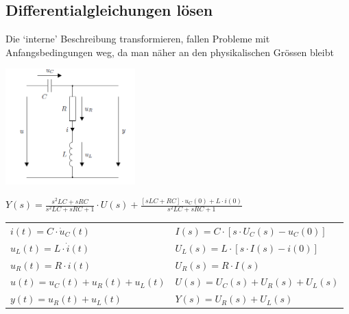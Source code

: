 \subsection{Differentialgleichungen lösen}
Die ‘interne’ Beschreibung transformieren, fallen Probleme mit Anfangsbedingungen weg, da man näher
an den physikalischen Grössen bleibt\\
\begin{minipage}{0.45\textwidth}
  \begin{center}
    \includegraphics[width=5cm]{./images/diffgleichung.png}
  \end{center}
  $Y(s) = \frac{s^2 LC+sRC}{s^2 LC +sRC +1}\cdot U(s) + \frac{[sLC + RC] \cdot u_{C}(0) + L \cdot i(0)}{s^2 LC +sRC +1}$
\end{minipage}
\begin{minipage}{0.55\textwidth}
  \begin{center}
	\begin{tabular}{ll}
		$i(t) = C \cdot \dot{u}_{C}(t)$ & $I(s) = C  \cdot  [s  \cdot  U_{C}(s) - u_{C}(0)]$  \\
		$u_{L}(t) = L \cdot \dot{i}(t)$ & $U_{L}(s) = L  \cdot  [s  \cdot  I(s) - i(0)]$ \\
		$u_{R}(t) = R \cdot i(t)$ & $U_{R}(s) = R  \cdot  I(s)$ \\
		$u(t) = u_{C}(t) + u_{R}(t) + u_{L}(t)$ & $U(s) = U_{C}(s) + U_{R}(s) + U_{L}(s)$ \\
		$y(t) = u_{R}(t) + u_{L}(t)$ & $Y (s) = U_{R}(s) + U_{L}(s)$ \\
	\end{tabular}
\end{center}
\end{minipage}




